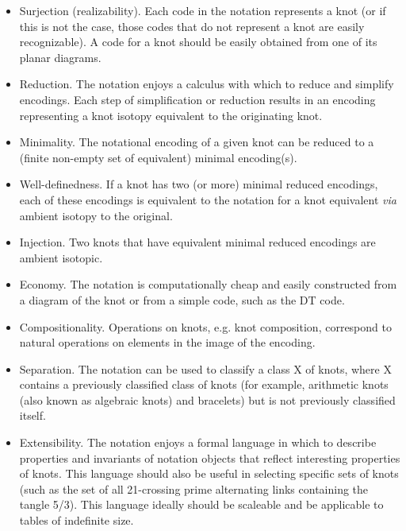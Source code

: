 \begin{itemize}


\item {Surjection (realizability).} Each code in the notation represents
  a knot (or if this is not the case, those codes that do not
  represent a knot are easily recognizable). A code for a knot should
  be easily obtained from one of its planar diagrams.

\item {Reduction.} The notation enjoys a calculus with which to reduce
  and simplify encodings. Each step of simplification or reduction
  results in an encoding representing a knot isotopy equivalent to the
  originating knot.

\item {Minimality.} The notational encoding of a given knot can be
  reduced to a (finite non-empty set of equivalent) minimal
  encoding(s).

\item {Well-definedness.} If a knot has two (or more) minimal reduced
  encodings, each of these encodings is equivalent to the notation for
  a knot equivalent \emph{via} ambient isotopy to the original.

\item {Injection.} Two knots that have equivalent
  minimal reduced encodings are ambient isotopic.


	\item {Economy.} The notation is computationally cheap and easily constructed from a diagram of the knot or from a simple code, such as the DT code.
	
\item {Compositionality.} Operations on knots, e.g. knot
  composition, correspond to natural operations on elements in the
  image of the encoding.
  
\item {Separation.} The notation can be used to classify a class X of
  knots, where X contains a previously classified class of knots (for
  example, arithmetic knots (also known as algebraic knots) and
  bracelets) but is not previously classified itself.

\item {Extensibility.} The notation enjoys a formal language in which
  to describe properties and invariants of notation objects that
  reflect interesting properties of knots. This language should also
  be useful in selecting specific sets of knots (such as the set of
  all 21-crossing prime alternating links containing the tangle
  5/3). This language ideally should be scaleable and be applicable to
  tables of indefinite size.
\end{itemize}

